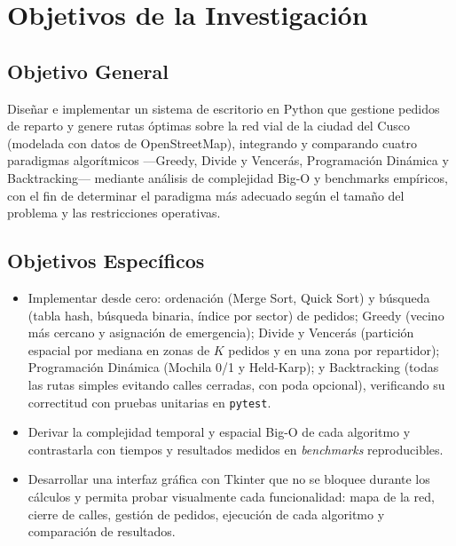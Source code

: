 \chapter{Objetivos de la Investigación}
\label{ch:objetivos_ph}

\section{Objetivo General}

Diseñar e implementar un sistema de escritorio en Python que gestione pedidos de reparto y genere rutas óptimas sobre la red vial de la ciudad del Cusco (modelada con datos de OpenStreetMap), integrando y comparando cuatro paradigmas algorítmicos —Greedy, Divide y Vencerás, Programación Dinámica y Backtracking— mediante análisis de complejidad Big-O y benchmarks empíricos, con el fin de determinar el paradigma más adecuado según el tamaño del problema y las restricciones operativas.

\section{Objetivos Específicos}

\begin{itemize}
    \item Implementar desde cero: ordenación (Merge Sort, Quick Sort) y búsqueda (tabla hash, búsqueda binaria, índice por sector) de pedidos; Greedy (vecino más cercano y asignación de emergencia); Divide y Vencerás (partición espacial por mediana en zonas de $K$ pedidos y en una zona por repartidor); Programación Dinámica (Mochila 0/1 y Held-Karp); y Backtracking (todas las rutas simples evitando calles cerradas, con poda opcional), verificando su correctitud con pruebas unitarias en \texttt{pytest}.
    \item Derivar la complejidad temporal y espacial Big-O de cada algoritmo y contrastarla con tiempos y resultados medidos en \textit{benchmarks} reproducibles.
    \item Desarrollar una interfaz gráfica con Tkinter que no se bloquee durante los cálculos y permita probar visualmente cada funcionalidad: mapa de la red, cierre de calles, gestión de pedidos, ejecución de cada algoritmo y comparación de resultados.
\end{itemize}
